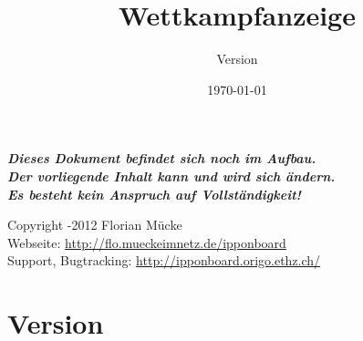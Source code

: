﻿\documentclass[11pt,numbers=noenddot]{scrreprt}
\title{{\IB} Wettkampfanzeige}
\subtitle{Version \IBVersion}
\date{\today}
\begin{document}
\maketitle

\thispagestyle{empty}

\vspace*{\fill}

{\centering\bfseries\itshape\LARGE
Dieses Dokument befindet sich noch im Aufbau.\\
Der vorliegende Inhalt kann und wird sich ändern.\\
Es besteht kein Anspruch auf Vollständigkeit! \par}

\vspace*{\fill}

\begin{center}
{%
Copyright -2012 Florian Mücke \\
Webseite: \url{http://flo.mueckeimnetz.de/ipponboard} \\
Support, Bugtracking: \url{http://ipponboard.origo.ethz.ch/}}
\end{center}


\renewcommand\contentsname{Inhalt}
\tableofcontents

\chapter{Version}
\end{document}
